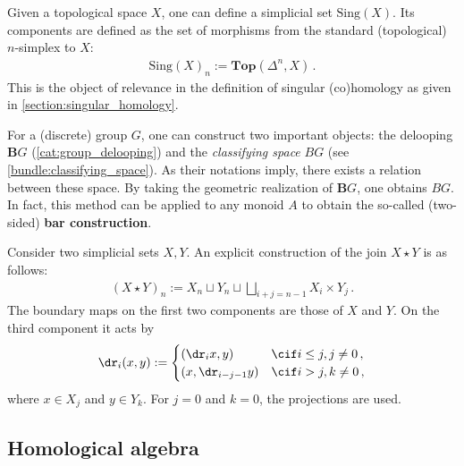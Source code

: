     \begin{example}\label{model:singular_set}
        Given a topological space $X$, one can define a simplicial set $\mathrm{Sing}(X)$. Its components are defined as the set of morphisms from the standard (topological) $n$-simplex to $X$:
        \begin{gather}
            \mathrm{Sing}(X)_n := \mathbf{Top}(\Delta^n,X)\,.
        \end{gather}
        This is the object of relevance in the definition of singular (co)homology as given in \cref{section:singular_homology}.
    \end{example}

    \begin{property}\label{model:classifying_space}
        For a (discrete) group $G$, one can construct two important objects: the delooping $\mathbf{B}G$ (\cref{cat:group_delooping}) and the \textit{classifying space} $BG$ (see \cref{bundle:classifying_space}). As their notations imply, there exists a relation between these space. By taking the geometric realization of $\mathbf{B}G$, one obtains $BG$. In fact, this method can be applied to any monoid $A$ to obtain the so-called (two-sided) \textbf{bar construction}.
    \end{property}

    \begin{construct}[Join]
        Consider two simplicial sets $X,Y$. An explicit construction of the join $X\star Y$ is as follows:
        \begin{gather}
            (X\star Y)_n := X_n\sqcup Y_n\sqcup\bigsqcup_{i+j=n-1}X_i\times Y_j\,.
        \end{gather}
        The boundary maps on the first two components are those of $X$ and $Y$. On the third component it acts by
        \begin{gather}
            \dr_i(x,y) :=
            \begin{cases}
                (\dr_ix,y)&\cif i\leq j,j\neq0\,,\\
                (x,\dr_{i-j-1}y)&\cif i>j,k\neq0\,,
            \end{cases}
        \end{gather}
        where $x\in X_j$ and $y\in Y_k$. For $j=0$ and $k=0$, the projections are used.
    \end{construct}

\subsection{Homological algebra}

